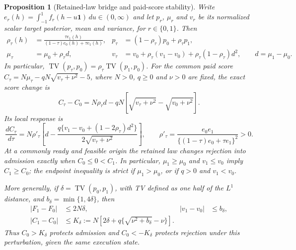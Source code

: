 \documentclass[10pt]{article}
\newtheorem{proposition}{Proposition}
\begin{document}
\begin{proposition}[Retained-law bridge and paid-score stability]
\label{prop:retained-pairing-paid-bridge}
Write $e_r(h)=\int_{-1}^{1}f_r(h-u\mathbf1)\,du\in(0,\infty)$ and
let $p_r$, $\mu_r$ and $v_r$ be its normalized scalar target posterior,
mean and variance, for $r\in\{0,1\}$.  Then
\begin{align}
 \rho_\tau(h)&=\frac{\tau e_1(h)}{(1-\tau)e_0(h)+\tau e_1(h)},
 &p_\tau&=(1-\rho_\tau)p_0+\rho_\tau p_1,
 \label{eq:retained-bridge-posterior}\\
 \mu_\tau&=\mu_0+\rho_\tau d,
 &v_\tau&=v_0+\rho_\tau(v_1-v_0)+\rho_\tau(1-\rho_\tau)d^2,
 \qquad d=\mu_1-\mu_0.
 \label{eq:retained-bridge-moments}
\end{align}
In particular, $\operatorname{TV}(p_\tau,p_0)=
\rho_\tau\operatorname{TV}(p_1,p_0)$.
For the common paid score $C_\tau=N\mu_\tau-qN\sqrt{v_\tau+\nu^2}-5$,
where $N>0$, $q\geq0$ and $\nu>0$ are fixed, the exact score change is
\begin{equation}
 C_\tau-C_0=N\rho_\tau d-qN
 \left[\sqrt{v_\tau+\nu^2}-\sqrt{v_0+\nu^2}\right].
 \label{eq:retained-bridge-paid-score}
\end{equation}
Its local response is
\begin{equation}
 \frac{dC_\tau}{d\tau}=N\rho'_\tau
 \left[d-\frac{q\{v_1-v_0+(1-2\rho_\tau)d^2\}}
 {2\sqrt{v_\tau+\nu^2}}\right],\qquad
 \rho'_\tau=\frac{e_0e_1}{\{(1-\tau)e_0+\tau e_1\}^2}>0.
 \label{eq:retained-bridge-score-response}
\end{equation}
At a commonly ready and feasible origin the retained law changes rejection into
admission exactly when $C_0\leq0<C_1$.  In particular,
$\mu_1\geq\mu_0$ and $v_1\leq v_0$ imply $C_1\geq C_0$; the endpoint
inequality is strict if $\mu_1>\mu_0$, or if $q>0$ and $v_1<v_0$.

More generally, if $\delta=\operatorname{TV}(p_0,p_1)$, with TV defined
as one half of the $L^1$ distance, and $b_\delta=\min\{1,4\delta\}$, then
\begin{align}
 |F_1-F_0|&\leq2N\delta,
 &|v_1-v_0|&\leq b_\delta,\nonumber\\
 |C_1-C_0|&\leq K_\delta
 :=N\left[2\delta+q\{\sqrt{\nu^2+b_\delta}-\nu\}\right].
 \label{eq:retained-bridge-score-tv}
\end{align}
Thus $C_0>K_\delta$ protects admission and $C_0<-K_\delta$ protects
rejection under this perturbation, given the same execution state.
\end{proposition}
\end{document}
